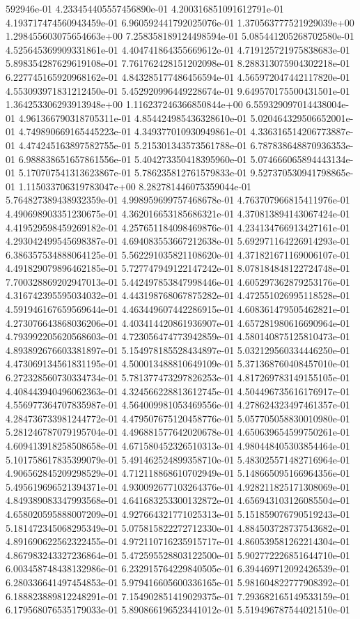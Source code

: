 592946e-01	4.233454405557456890e-01	4.200316851091612791e-01	4.193717474560943459e-01	6.960592441792025076e-01	1.370563777521929039e+00	1.298455603075654663e+00	7.258358189124498594e-01	5.085441205268702580e-01	4.525645369909331861e-01	4.404741864355669612e-01	4.719125721975838683e-01	5.898354287629619108e-01	7.761762428151202098e-01	8.288313075904302218e-01	6.227745165920968162e-01	4.843285177486456594e-01	4.565972047442117820e-01	4.553093971831212450e-01	5.452920996449228674e-01	9.649570175500431501e-01	1.364253306293913948e+00	1.116237246366850844e+00	6.559329097014438004e-01	4.961366790318705311e-01	4.854424985436328610e-01	5.020464329506652001e-01	4.749890669165445223e-01	4.349377010930949861e-01	4.336316514206773887e-01	4.474245163897582755e-01	5.215301343573561788e-01	6.787838648870936353e-01	6.988838651657861556e-01	5.404273350418395960e-01	5.074666065894443134e-01	5.170707541313623867e-01	5.786235812761579833e-01	9.527370530941798865e-01	1.115033706319783047e+00	8.282781446075359044e-01	5.764827389438932359e-01	4.998959699757468678e-01	4.763707966815411976e-01	4.490698903351230675e-01	4.362016653185686321e-01	4.370813894143067424e-01	4.419529598459269182e-01	4.257651184098469876e-01	4.234134766913427161e-01	4.293042499545698387e-01	4.694083553667212638e-01	5.692971164226914293e-01	6.386357534888064125e-01	5.562291035821108620e-01	4.371821671169006107e-01	4.491829079896462185e-01	5.727747949122147242e-01	8.078184848122724748e-01	7.700328869202947013e-01	5.442497853847998446e-01	4.605297362879253176e-01	4.316742395595034032e-01	4.443198768067875282e-01	4.472551026995118528e-01	4.591946167659569644e-01	4.463449607442286915e-01	4.608361479505462821e-01	4.273076643868036206e-01	4.403414420861936907e-01	4.657281980616690964e-01	4.793992205620568603e-01	4.723056474773942859e-01	4.580140875125810473e-01	4.893892676603381897e-01	5.154978185528434897e-01	5.032129560334446250e-01	4.473069134561831195e-01	4.500013488810649109e-01	5.371368760408457010e-01	6.272328560730334734e-01	5.781377473297826253e-01	4.817269783149155105e-01	4.408443940496062363e-01	4.324566228813612745e-01	4.504496735616176917e-01	4.556977364707835987e-01	4.564009981053469556e-01	4.278624323497461357e-01	4.284736733981244772e-01	4.479507675120458776e-01	5.057705058830010980e-01	5.281246787079195704e-01	4.496881577642020678e-01	4.650639654599750261e-01	4.609413918258508658e-01	4.671580452326510313e-01	4.980448405303854464e-01	5.101758617835399079e-01	5.491462524899358710e-01	5.483025571482716964e-01	4.906562845209298529e-01	4.712118868610702949e-01	5.148665095166964356e-01	5.495619696521394371e-01	4.930092677103264376e-01	4.928211825171308069e-01	4.849389083347993568e-01	4.641683253300132872e-01	4.656943103126085504e-01	4.658020595888007209e-01	4.927664321771025313e-01	5.151859076790519243e-01	5.181472345068295349e-01	5.075815822272712330e-01	4.884503728737543682e-01	4.891690622562322455e-01	4.972110716235915717e-01	4.860539581262214304e-01	4.867983243327236864e-01	5.472595528803122500e-01	5.902772226851644710e-01	6.003458748438132986e-01	6.232915764229840505e-01	6.394469712092426539e-01	6.280336641497454853e-01	5.979416605600336165e-01	5.981604822777908392e-01	6.188823889812248291e-01	7.154902851419029375e-01	7.293682165149533159e-01	6.179568076535179033e-01	5.890866196523441012e-01	5.519496787544021510e-01	